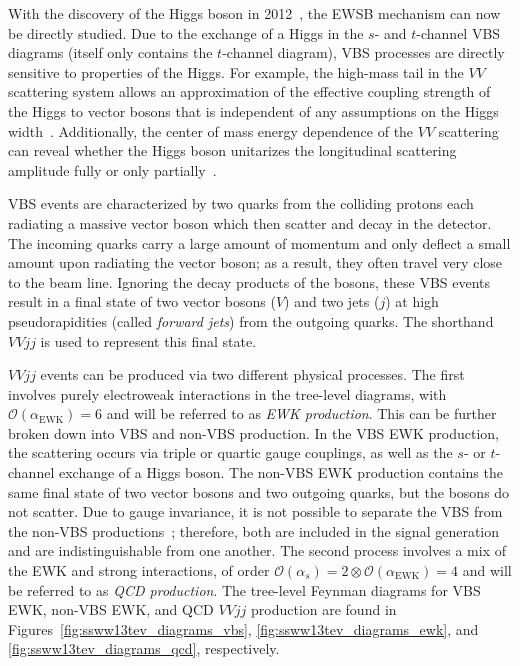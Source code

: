 With the discovery of the Higgs boson in 2012~\cite{HIGG-2012-27, CMS-HIG-12-028}, the EWSB mechanism can now be directly studied.
Due to the exchange of a Higgs in the $s$- and $t$-channel VBS diagrams (\ssww itself only contains the $t$-channel diagram), VBS processes are directly sensitive to properties of the Higgs.
For example, the high-mass tail in the $VV$ scattering system allows an approximation of the effective coupling strength of the Higgs to vector bosons that is independent of any assumptions on the Higgs width~\cite{2015.higgs-constraints-from-vbs}.
Additionally, the center of mass energy dependence of the $VV$ scattering can reveal whether the Higgs boson unitarizes the longitudinal scattering amplitude fully or only partially~\cite{2014.higgs-WW-scattering-theory}.

VBS events are characterized by two quarks from the colliding protons each radiating a massive vector boson which then scatter and decay in the detector.
The incoming quarks carry a large amount of momentum and only deflect a small amount upon radiating the vector boson; as a result, they often travel very close to the beam line.
Ignoring the decay products of the bosons, these VBS events result in a final state of two vector bosons ($V$) and two jets ($j$) at high pseudorapidities (called \emph{forward jets}) from the outgoing quarks.
The shorthand $VVjj$ is used to represent this final state.

$VVjj$ events can be produced via two different physical processes.
The first involves purely electroweak interactions in the tree-level diagrams, with $\mathcal{O}(\alpha_{\textrm{EWK}}) = 6$ %
and will be referred to as \emph{EWK production}.
This can be further broken down into VBS and non-VBS production.
In the VBS EWK production, the scattering occurs via triple or quartic gauge couplings, as well as the $s$- or $t$-channel exchange of a Higgs boson.
The non-VBS EWK production contains the same final state of two vector bosons and two outgoing quarks, but the bosons do not scatter.
Due to gauge invariance, it is not possible to separate the VBS from the non-VBS productions~\cite{2006.isolating-vbs-lhc}; therefore, both are included in the signal generation and are indistinguishable from one another.
The second process involves a mix of the EWK and strong interactions, of order $\mathcal{O}(\alpha_s) = 2 \otimes \mathcal{O}(\alpha_{\textrm{EWK}}) = 4$ and will be referred to as \emph{QCD production}.
The tree-level Feynman diagrams for VBS EWK, non-VBS EWK, and QCD $VVjj$ production are found in Figures~\ref{fig:ssww13tev_diagrams_vbs}, \ref{fig:ssww13tev_diagrams_ewk}, and \ref{fig:ssww13tev_diagrams_qcd}, respectively.

